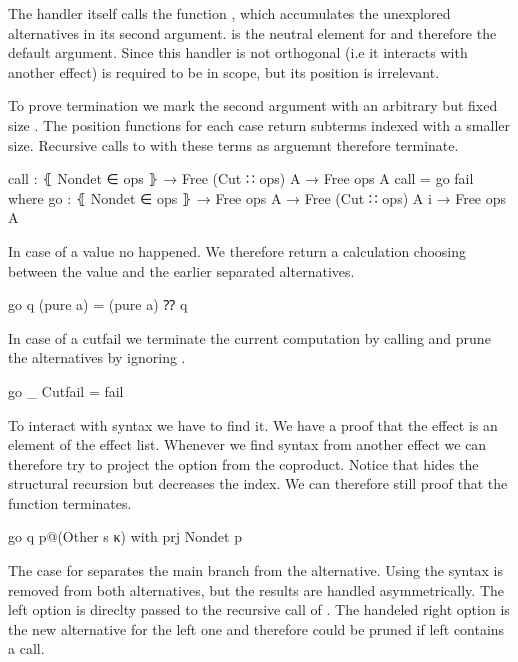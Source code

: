 \begin{AgdaAlign}
The handler itself calls the function , which accumulates the
unexplored alternatives in its second argument.
 is the neutral element for  and therefore
the default argument.
Since this handler is not orthogonal (i.e it interacts with another effect)
 is required to be in scope, but its position is irrelevant.

To prove termination we mark the second argument with an arbitrary but fixed size
.
The position functions for each case return subterms indexed with a smaller size.
Recursive calls to  with these terms as arguemnt therefore
terminate.

\begin{code}
call : ⦃ Nondet ∈ ops ⦄ → Free (Cut ∷ ops) A → Free ops A
call = go fail
  where
    go : ⦃ Nondet ∈ ops ⦄ → Free ops A → Free (Cut ∷ ops) A {i} → Free ops A
\end{code}
In case of a  value no 
happened.
We therefore return a calculation choosing between the value and the earlier
separated alternatives.

\begin{code}
    go q (pure a)       = (pure a) ⁇ q
\end{code}
In case of a cutfail we terminate the current computation by calling
 and prune the alternatives by ignoring .

\begin{code}
    go _ Cutfail        = fail
\end{code}
To interact with  syntax we have to find it.
We have a proof that the  effect is an element of the effect
list.
Whenever we find syntax from another effect we can therefore try to project the
 option from the coproduct.
Notice that  hides the structural recursion but decreases the
 index.
We can therefore still proof that the function terminates.

\begin{code}
    go q p@(Other s κ)  with prj {Nondet} p
\end{code}
The case for  separates the main branch from the alternative.
Using  the  syntax is removed from both
alternatives, but the results are handled asymmetrically.
The left option is direclty passed to the recursive call of
.
The handeled right option is the new alternative for the left one and therefore
could be pruned if left contains a  call.


\end{AgdaAlign}
